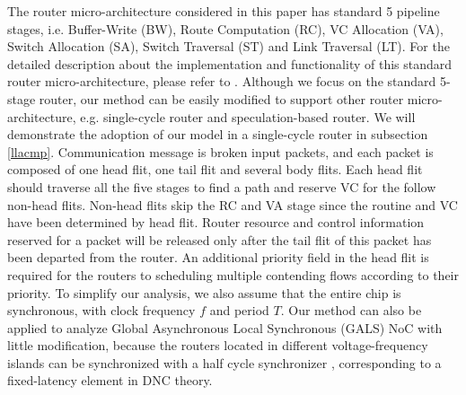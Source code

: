 \documentclass[10pt,journal]{IEEEtran}
\begin{document}
The router micro-architecture considered in this paper has standard 5 pipeline stages, i.e. Buffer-Write (BW), Route Computation (RC), VC Allocation (VA), Switch Allocation (SA), Switch Traversal (ST) and Link Traversal (LT). For the detailed description about the implementation and functionality of this standard router micro-architecture, please refer to \cite{jerger2009chip}. Although we focus on the standard 5-stage router, our method can be easily modified to support other router micro-architecture, e.g. single-cycle router and speculation-based router. We will demonstrate the adoption of our model in a single-cycle router in subsection \ref{llacmp}. Communication message is broken input packets, and each packet is composed of one head flit, one tail flit and several body flits. Each head flit should traverse all the five stages to find a path and reserve VC for the follow non-head flits. Non-head flits skip the RC and VA stage since the routine and VC have been determined by head flit. Router resource and control information reserved for a packet will be released only after the tail flit of this packet has been departed from the router. An additional priority field in the head flit is required for the routers to scheduling multiple contending flows according to their priority. To simplify our analysis, we also assume that the entire chip is synchronous, with clock frequency $f$ and period $T$. Our method can also be applied to analyze Global Asynchronous Local Synchronous (GALS) NoC with little modification, because the routers located in different voltage-frequency islands can be synchronized with a half cycle synchronizer \cite{5476986}, corresponding to a fixed-latency element in DNC theory.
\end{document}
